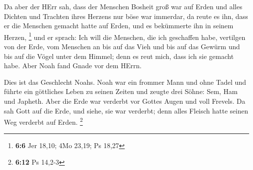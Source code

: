  Da aber der HErr sah, dass der Menschen Bosheit groß war
auf Erden und alles Dichten und Trachten ihres Herzens nur böse war
immerdar,  da reute es ihn, dass er die Menschen gemacht
hatte auf Erden, und es bekümmerte ihn in seinem Herzen, \footnote{\textbf{6:6}
  Jer 18,10; 4Mo 23,19; Ps 18,27}  und er sprach: Ich will
die Menschen, die ich geschaffen habe, vertilgen von der Erde, vom
Menschen an bis auf das Vieh und bis auf das Gewürm und bis auf die
Vögel unter dem Himmel; denn es reut mich, dass ich sie gemacht habe.
 Aber Noah fand Gnade vor dem HErrn.

 Dies ist das Geschlecht Noahs. Noah war ein frommer Mann
und ohne Tadel und führte ein göttliches Leben zu seinen Zeiten
 und zeugte drei Söhne: Sem, Ham und Japheth. 
Aber die Erde war verderbt vor Gottes Augen und voll Frevels.
 Da sah Gott auf die Erde, und siehe, sie war verderbt;
denn alles Fleisch hatte seinen Weg verderbt auf Erden. \footnote{\textbf{6:12}
  Ps 14,2-3}

